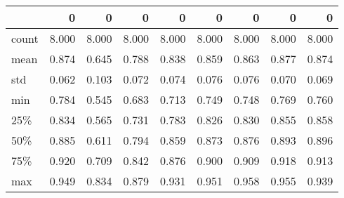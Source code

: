 \begin{tabular}{lrrrrrrrr}
\toprule
{} &      0 &      0 &      0 &      0 &      0 &      0 &      0 &      0 \\
\midrule
count &  8.000 &  8.000 &  8.000 &  8.000 &  8.000 &  8.000 &  8.000 &  8.000 \\
mean  &  0.874 &  0.645 &  0.788 &  0.838 &  0.859 &  0.863 &  0.877 &  0.874 \\
std   &  0.062 &  0.103 &  0.072 &  0.074 &  0.076 &  0.076 &  0.070 &  0.069 \\
min   &  0.784 &  0.545 &  0.683 &  0.713 &  0.749 &  0.748 &  0.769 &  0.760 \\
25\%   &  0.834 &  0.565 &  0.731 &  0.783 &  0.826 &  0.830 &  0.855 &  0.858 \\
50\%   &  0.885 &  0.611 &  0.794 &  0.859 &  0.873 &  0.876 &  0.893 &  0.896 \\
75\%   &  0.920 &  0.709 &  0.842 &  0.876 &  0.900 &  0.909 &  0.918 &  0.913 \\
max   &  0.949 &  0.834 &  0.879 &  0.931 &  0.951 &  0.958 &  0.955 &  0.939 \\
\bottomrule
\end{tabular}
